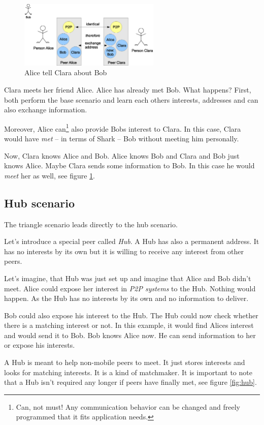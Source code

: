 \begin{figure}[t]
\centering
\includegraphics[width=0.60\textwidth]{triangle.eps}
\caption{Alice tell Clara about Bob}
\label{fig:triangle}
\end{figure}

Clara meets her friend Alice. Alice has already met Bob. What happens? First, both perform the base scenario and learn each others interests, addresses and can also exchange information.

Moreover, Alice can\footnote{Can, not must! Any communication behavior can be changed and freely programmed that it fits application needs.} also provide Bobs interest to Clara. In this case, Clara would have {\it met} -- in terms of Shark -- Bob without meeting him personally. 

Now, Clara knows Alice and Bob. Alice knows Bob and Clara and Bob just knows Alice. Maybe Clara sends some information to Bob. In this case he would {\it meet} her as well, see figure \ref{fig:triangle}.

\subsection{Hub scenario}
The triangle scenario leads directly to the hub scenario.

Let's introduce a special peer called {\it Hub}. A Hub has also a permanent address. It has no interests by its own but it is willing to receive any interest from other peers.

Let's imagine, that Hub was just set up and imagine that Alice and Bob didn't meet. Alice could expose her interest in {\it P2P systems} to the Hub. Nothing would happen. As the Hub has no interests by its own and no information to deliver.

Bob could also expose his interest to the Hub. The Hub could now check whether there is a matching interest or not. In this example, it would find Alices interest and would send it to Bob. Bob knows Alice now. He can send information to her or expose his interests.

A Hub is meant to help non-mobile peers to meet. It just stores interests and looks for matching interests. It is a kind of matchmaker. It is important to note that a Hub isn't required any longer if peers have finally met, see figure \ref{fig:hub}.

